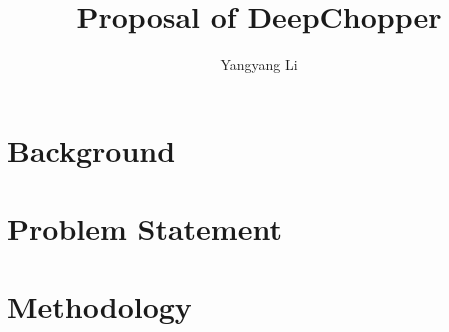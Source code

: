 \documentclass[english,10pt,a4paper]{article}
\title{Proposal of DeepChopper}
\author{Yangyang Li}
\begin{document}
\maketitle


\section*{Background}



\section*{Problem Statement}



\section*{Methodology}
\end{document}
